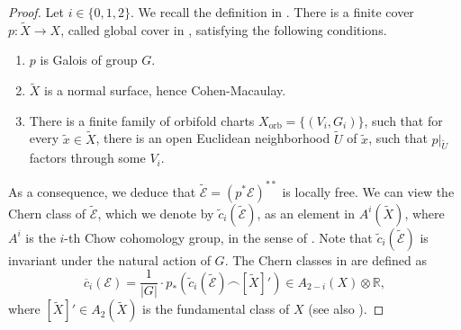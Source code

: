 \documentclass[12pt]{amsart}
\newcommand{\<}{\leq}
\def\mcE{\mathcal{E}}
\theoremstyle{remark}
\theoremstyle{definition}
\theoremstyle{definition}
\numberwithin{equation}{section}
\theoremstyle{definition}
\theoremstyle{definition}
\def\orb{\mathrm{orb}}
\begin{document}
\begin{proof}
Let $i\in \{0,1,2\}$.     
We recall the definition in  \cite[Chapter 10]{Kol92}. 
There is a finite   cover $p\colon \widetilde{X} \to X$, called global cover in \cite[Section 2]{Mumford83},  satisfying the following conditions. %
\begin{enumerate}
    \item $p$ is Galois of group $G$. 
    \item $\widetilde{X}$ is a normal surface, hence Cohen-Macaulay. 
    \item  There is a finite family of orbifold charts  $X_{\orb}=\{(V_i,G_i)\}$, such that for every $\tilde{x}\in \widetilde{X}$, there is an open Euclidean neighborhood $\widetilde{U}$ of $\tilde{x}$, such that $p|_{\widetilde{U}}$ factors through some $V_i$.
   \end{enumerate}
As a consequence, we deduce that  $ \widetilde{\mcE}  = (p^*\mcE)^{**}$ is locally free.  
We can view the Chern class of $\widetilde{\mcE}$, which we denote by $\tilde{c}_i(\widetilde{\mcE})$, 
as an element in $A^i(\widetilde{X})$, where $A^i$ is the $i$-th Chow cohomology group, in the sense of \cite[Chapter 17]{Fulton}.  
Note that $\tilde{c}_i(\widetilde{\mcE})$  is invariant under the natural action of $G$.  
The Chern classes in \cite[Chapter 10]{Kol92} are defined as 
\[
\overline{c}_i(\mcE) = 
\frac{1}{|G|} \cdot  p_* ( \tilde{c}_i(\widetilde{\mcE})  \smallfrown [ \widetilde{X}]'  ) \in A_{2-i}(X)\otimes \mathbb{R}, 
\]
where $[ \widetilde{X}]' \in A_2(\widetilde{X})$  is the fundamental class of $X$ (see also \cite[Lemma 3.5]{Mumford83}).  

 


\end{proof}
\end{document}
